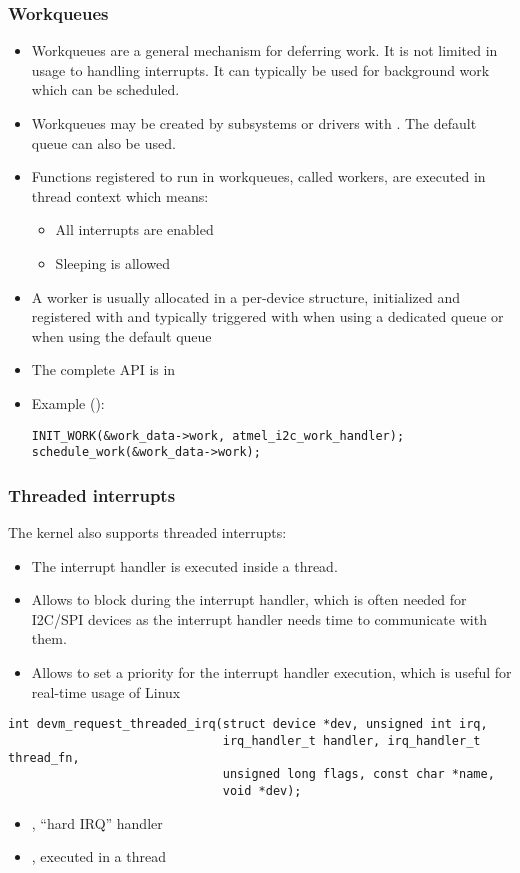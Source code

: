 \begin{frame}[fragile]
  \frametitle{Workqueues}
  \begin{itemize}
  \item Workqueues are a general mechanism for deferring work. It is
    not limited in usage to handling interrupts. It can typically
    be used for background work which can be scheduled.
  \item Workqueues may be created by subsystems or drivers with
    . The default queue can also be used.
  \item Functions registered to run in workqueues, called workers, are
    executed in thread context which means:
    \begin{itemize}
    \item All interrupts are enabled
    \item Sleeping is allowed
    \end{itemize}
  \item A worker is usually allocated in a per-device structure,
    initialized and registered with  and typically
    triggered with  when using a dedicated queue or
     when using the default queue
  \item The complete API is in 
  \item Example ():
\begin{verbatim}
INIT_WORK(&work_data->work, atmel_i2c_work_handler);
schedule_work(&work_data->work);
\end{verbatim}
  \end{itemize}
\end{frame}

\begin{frame}[fragile]
  \frametitle{Threaded interrupts}
  The kernel also supports threaded interrupts:
  \begin{itemize}
  \item The interrupt handler is executed inside a thread.
  \item Allows to block during the interrupt handler, which is often
        needed for I2C/SPI devices as the interrupt handler needs time
	to communicate with them.
  \item Allows to set a priority for the interrupt handler
        execution, which is useful for real-time usage of Linux
  \end{itemize}
  \begin{verbatim}
int devm_request_threaded_irq(struct device *dev, unsigned int irq,
                              irq_handler_t handler, irq_handler_t thread_fn,
                              unsigned long flags, const char *name,
                              void *dev);
  \end{verbatim}
  \begin{itemize}
  \item {}, ``hard IRQ'' handler
  \item {}, executed in a thread
  \end{itemize}
\end{frame}

